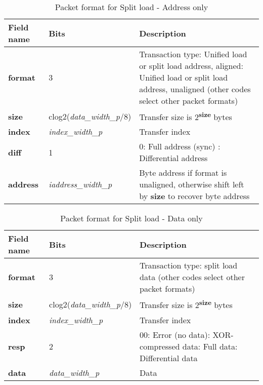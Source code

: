 \begin{table}[htp]
  \centering
  \caption{Packet format for Split load - Address only}
  \label{tab:te_datadx0y3}
  \begin{tabulary}{\textwidth}{|l|p{40mm}|p{90mm}|}
    \hline
    {\bf Field name} & {\bf Bits} & {\bf Description} \\
    \hline
    \textbf{format} & 	3	& Transaction type: Unified load or split load address, aligned: Unified load or split load address, unaligned\newline
		(other codes select other packet formats)\\
    \hline
    \textbf{size} & clog2(\textit{data\_width\_p}/8) & Transfer size is 2\textsuperscript{\textbf{size}} bytes \\
    \hline
    \textbf{index} & \textit{index\_width\_p} & Transfer index\\
    \hline
    \textbf{diff} & 1 & 0: Full address (sync)	: Differential address\\
    \hline
    \textbf{address} &  \textit{iaddress\_width\_p} & Byte address if format is unaligned, otherwise shift left by \textbf{size} to recover byte address \\
    \hline
  \end{tabulary}
\end{table}

\begin{table}[htp]
  \centering
  \caption{Packet format for Split load - Data only}
  \label{tab:te_datadx0y4}
  \begin{tabulary}{\textwidth}{|l|p{40mm}|p{90mm}|}
    \hline
    {\bf Field name} & {\bf Bits} & {\bf Description} \\
    \hline
    \textbf{format} & 	3	& Transaction type: split load data\newline	
		(other codes select other packet formats)\\
    \hline
    \textbf{size} & clog2(\textit{data\_width\_p}/8) & Transfer size is 2\textsuperscript{\textbf{size}} bytes \\
    \hline
    \textbf{index} & \textit{index\_width\_p} & Transfer index\\
    \hline
    \textbf{resp} & 	2	& 
		00: Error (no data): XOR-compressed data: Full data: Differential data\\
    \hline
    \textbf{data} & \textit{data\_width\_p} & 
                Data\\
    \hline
  \end{tabulary}
\end{table}

